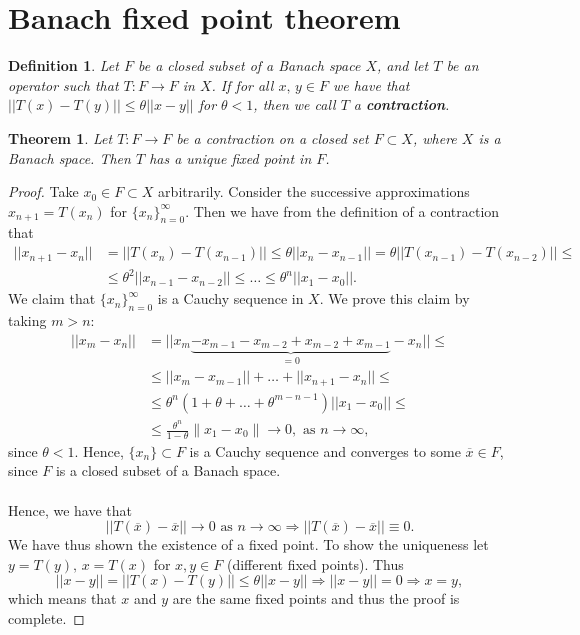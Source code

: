 \documentclass[12pt, a4paper]{article}
\newtheorem{theorem}{Theorem}[section]
\newtheorem{delfin}{Definition}[section]
\begin{document}
\section{Banach fixed point theorem}
\begin{delfin}
Let $F$ be a closed subset of a Banach space $X$, and let $T$ be an operator such that $T : F \to F$ in $X$. If for all $x,\,y\in F$ we have that $||T(x)-T(y)|| \leq \theta ||x-y||$ for $\theta<1$, then we call $T$ a \textbf{contraction}. 
\end{delfin}
\begin{theorem}
Let $T : F \to F$ be a contraction on a closed set $F\subset X$, where $X$ is a Banach space. Then $T$ has a unique fixed point in $F$.
\end{theorem}
\begin{proof}
Take $x_0\in F\subset X$ arbitrarily. Consider the successive approximations $x_{n+1} = T(x_n)$ for $\{x_n\}_{n=0}^\infty$. Then we have from the definition of a contraction that
\begin{equation*}
\begin{split}
||x_{n+1}-x_n|| &= ||T(x_n) - T(x_{n-1})|| \leq \theta || x_n - x_{n-1}|| =  \theta ||T(x_{n-1}) - T(x_{n-2})|| \leq \\
&\leq \theta^2 ||x_{n-1}-x_{n-2}|| \leq \dots \leq \theta^n ||x_1 - x_0||.
\end{split}
\end{equation*}
We claim that $\{x_n\}_{n=0}^\infty$ is a Cauchy sequence in $X$. We prove this claim by taking $m>n$:
\begin{equation*}
\begin{split}
||x_m-x_n|| &= ||x_m \underbrace{-x_{m-1}-x_{m-2}+x_{m-2}+x_{m-1}}_{=0} - x_n|| \leq \\
&\leq ||x_m-x_{m-1}|| + \dots + ||x_{n+1}-x_n|| \leq \\
& \leq \theta^n (1+\theta + \dots + \theta^{m-n-1})||x_1-x_0|| \leq \\
& \leq \frac{\theta^n}{1-\theta}\|x_1-x_0\| \to 0, \text{ as } n \to \infty,
\end{split}
\end{equation*}
since $\theta<1$. Hence, $\{x_n\}\subset F$ is a Cauchy sequence and converges to some $\overline{x}\in F$, since $F$ is a closed subset of a Banach space.
\\\\
Hence, we have that
\begin{equation*}
||T(\overline{x})-\overline{x}|| \to 0 \text{ as } n\to\infty \Rightarrow ||T(\overline{x})-\overline{x}|| \equiv 0.
\end{equation*}
We have thus shown the existence of a fixed point. To show the uniqueness let $y=T(y),\, x=T(x)$ for $x,y\in F$ (different fixed points). Thus
\begin{equation*}
||x-y|| = ||T(x)-T(y)||\leq \theta ||x-y|| \Rightarrow ||x-y||=0 \Rightarrow x = y,
\end{equation*}
which means that $x$ and $y$ are the same fixed points and thus the proof is complete.
\end{proof}
\end{document}
